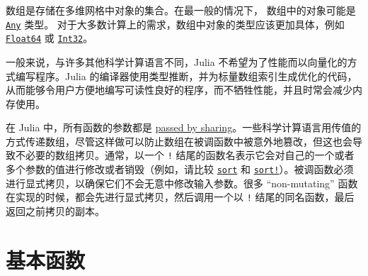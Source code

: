数组是存储在多维网格中对象的集合。在最一般的情况下， 数组中的对象可能是 \hyperlink{15014186392807667022}{\texttt{Any}} 类型。 对于大多数计算上的需求，数组中对象的类型应该更加具体，例如 \hyperlink{5027751419500983000}{\texttt{Float64}} 或 \hyperlink{10103694114785108551}{\texttt{Int32}}。



一般来说，与许多其他科学计算语言不同，Julia 不希望为了性能而以向量化的方式编写程序。Julia 的编译器使用类型推断，并为标量数组索引生成优化的代码，从而能够令用户方便地编写可读性良好的程序，而不牺牲性能，并且时常会减少内存使用。



在 Julia 中，所有函数的参数都是 \href{https://en.wikipedia.org/wiki/Evaluation\_strategy\#Call\_by\_sharing}{passed by sharing}。一些科学计算语言用传值的方式传递数组，尽管这样做可以防止数组在被调函数中被意外地篡改，但这也会导致不必要的数组拷贝。通常，以一个 \texttt{!} 结尾的函数名表示它会对自己的一个或者多个参数的值进行修改或者销毁（例如，请比较 \hyperlink{8473525809131227606}{\texttt{sort}} 和 \hyperlink{12296873681374954808}{\texttt{sort!}}）。被调函数必须进行显式拷贝，以确保它们不会无意中修改输入参数。很多 “non-mutating” 函数在实现的时候，都会先进行显式拷贝，然后调用一个以 \texttt{!} 结尾的同名函数，最后返回之前拷贝的副本。



\hypertarget{3050591823172658870}{}


\section{基本函数}





